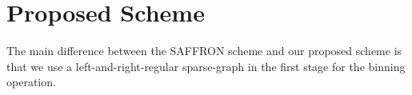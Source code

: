 \documentclass[conference,twocolumn]{IEEEtran}
\def\ceps{c_{\epsilon}}
\begin{document}
%
%


\section{Proposed Scheme}
The main difference between the SAFFRON scheme and our proposed scheme is that we use a left-and-right-regular sparse-graph in the first stage for the binning operation.
\end{document}
